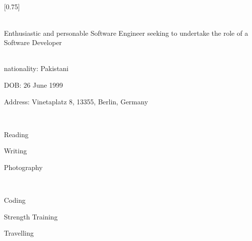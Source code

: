 \documentclass[lighthipster]{simplehipstercv}
\begin{document}
\subsection*{}
\vspace{-10mm}
\setlength{\columnsep}{1.5cm}
[0.75]
\begin{paracol}{2}

\paracolbackgroundoptions



\footnotesize
{\setasidefontcolour
\flushright
\begin{center}
\end{center}

\\[0.5em]

{\footnotesize
Enthusiastic and personable Software Engineer seeking to undertake the role of a Software Developer}
\vspace{4em}
\bigskip

 \\[0.5em]

nationality: Pakistani 

DOB: 26 June 1999

Address: Vinetaplatz 8, 13355, Berlin, Germany



\vspace{4em}
\bigskip

\\[0.5em]

\item Reading
\item Writing
\item Photography
\vspace{4em}
\bigskip

\\[0.5em]

\item{Coding}
\item{Strength Training}
\item{Travelling}


\vspace{4em}
\\[0.5em]

}
\end{paracol}
\end{document}
